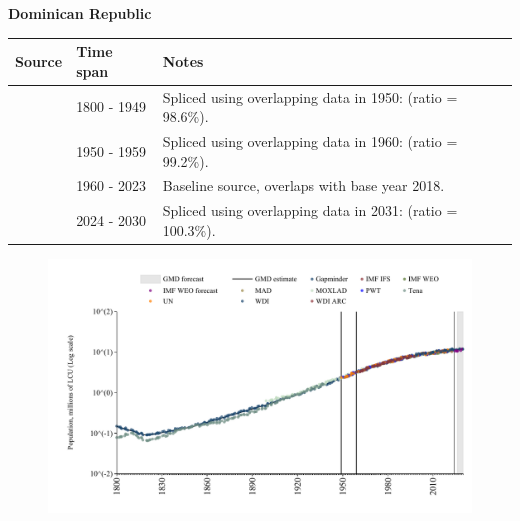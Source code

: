 \documentclass[12pt,a4paper,landscape]{article}
\begin{document}
\begin{adjustbox}{max totalsize={\paperwidth}{\paperheight},center}
\begin{minipage}[t][\textheight][t]{\textwidth}
\vspace*{0.5cm}
{}
\begin{center}
{\Large\bfseries Dominican Republic}
\end{center}
\vspace{0.5cm}
\begin{table}[H]
\centering
\small
\begin{tabular}{|l|l|l|}
\hline
\textbf{Source} & \textbf{Time span} & \textbf{Notes} \\
\hline
\rowcolor{white}\cite{Gapminder}& 1800 - 1949 &Spliced using overlapping data in 1950: (ratio = 98.6\%).\\
\rowcolor{lightgray}\cite{IMF_IFS}& 1950 - 1959 &Spliced using overlapping data in 1960: (ratio = 99.2\%).\\
\rowcolor{white}\cite{WDI}& 1960 - 2023 &Baseline source, overlaps with base year 2018.\\
\rowcolor{lightgray}\cite{Gapminder}& 2024 - 2030 &Spliced using overlapping data in 2031: (ratio = 100.3\%).\\
\hline
\end{tabular}
\end{table}
\begin{figure}[H]
\centering
\includegraphics[width=\textwidth,height=0.6\textheight,keepaspectratio]{graphs/DOM_pop.pdf}
\end{figure}
\end{minipage}
\end{adjustbox}
\end{document}
